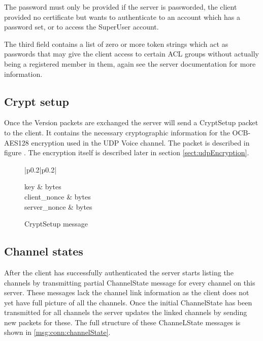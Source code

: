 \documentclass[11pt]{article} %
\newenvironment{mumbleMessage}[1]
{%
\begin{center}
	\begin{tabular}{|p{0.2\textwidth}|p{0.2\textwidth}|}
	\hline
	\multicolumn{2}{|>{\columncolor[rgb]{0.5,0.75,1}}l|}{\textbf{#1}} \\
	\hline
}
{%
	\\ \hline
	\end{tabular}
\end{center}
}
\begin{document}
The password must only be provided if the server is passworded, the client provided no certificate but wants to authenticate to an account which has a password set, or to access the SuperUser account.

The third field contains a list of zero or more token strings which act as passwords that may give the client access to certain ACL groups without actually being a registered member in them, again see the server documentation for more information.

\subsection{Crypt setup}
Once the Version packets are exchanged the server will send a CryptSetup packet to the client. It contains the necessary cryptographic information for the OCB-AES128 encryption used in the UDP Voice channel. The packet is described in figure \label{msg:conn:cryptSetup}. The encryption itself is described later in section \ref{sect:udpEncryption}.

\begin{figure}[H]\begin{center}
\begin{mumbleMessage}{CryptSetup}
	key				& bytes \\
	client\_nonce	& bytes \\
	server\_nonce	& bytes
\end{mumbleMessage}

\caption{CryptSetup message}\label{msg:conn:cryptSetup}
\end{center}\end{figure}

\subsection{Channel states}
\label{sect:conn:channels}

After the client has successfully authenticated the server starts listing the channels by transmitting partial ChannelState message for every channel on this server. These messages lack the channel link information as the client does not yet have full picture of all the channels. Once the initial ChannelState has been transmitted for all channels the server updates the linked channels by sending new packets for these. The full structure of these ChanneLState messages is shown in \ref{msg:conn:channelState}.
\end{document}

